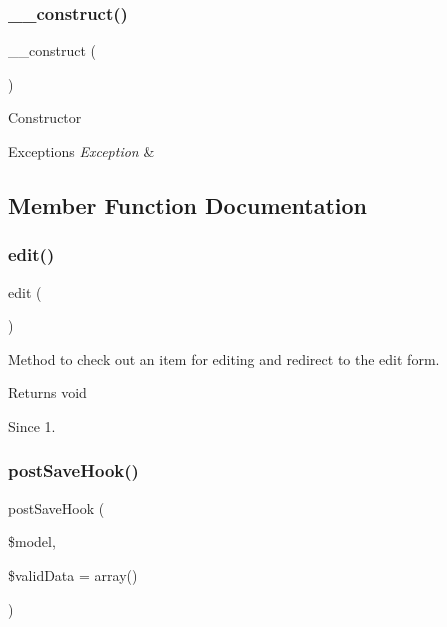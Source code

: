 \subsubsection{\+\_\+\+\_\+construct()}
{\footnotesize\ttfamily \+\_\+\+\_\+construct (\begin{DoxyParamCaption}{ }\end{DoxyParamCaption})}

Constructor


\begin{DoxyExceptions}{Exceptions}
{\em Exception} & \\
\hline
\end{DoxyExceptions}


\subsection{Member Function Documentation}
\mbox{\label{classtks__agenda_controller_item_a5cb75cbb16467eb1768837d126dc535b}} 
\subsubsection{edit()}
{\footnotesize\ttfamily edit (\begin{DoxyParamCaption}{ }\end{DoxyParamCaption})}

Method to check out an item for editing and redirect to the edit form.

\begin{DoxyReturn}{Returns}
void
\end{DoxyReturn}
\begin{DoxySince}{Since}
1. 
\end{DoxySince}
\mbox{\label{classtks__agenda_controller_item_ae481c4ac79c87f3d35b104c53d29ff6f}} 
\subsubsection{post\+Save\+Hook()}
{\footnotesize\ttfamily post\+Save\+Hook (\begin{DoxyParamCaption}\item[{J\+Model\+Legacy}]{\$model,  }\item[{}]{\$valid\+Data = {\ttfamily array()} }\end{DoxyParamCaption})\hspace{0.3cm}{\ttfamily [protected]}}

